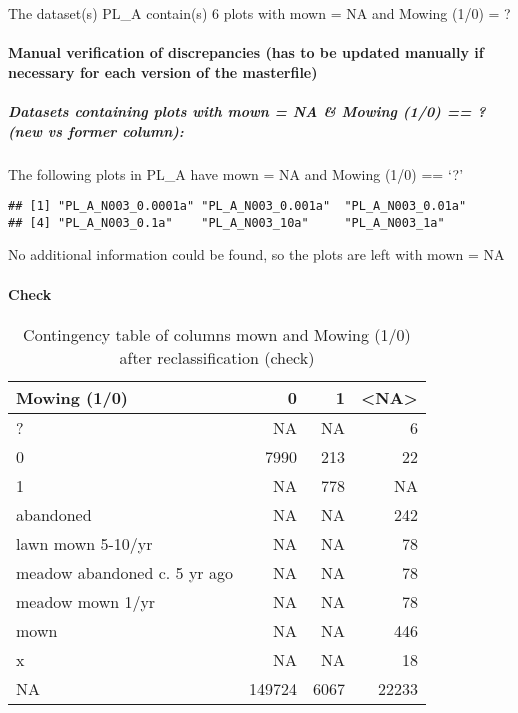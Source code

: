 \documentclass[table]{article}
\let\oldparagraph\paragraph
\renewcommand{\paragraph}[1]{\oldparagraph{#1}\mbox{}}
\let\oldsubparagraph\subparagraph
\renewcommand{\subparagraph}[1]{\oldsubparagraph{#1}\mbox{}}
\begin{document}
The dataset(s) PL\_A contain(s) 6 plots with mown = NA and Mowing (1/0)
= ?

\paragraph{Manual verification of discrepancies (has to be updated
manually if necessary for each version of the
masterfile)}\label{manual-verification-of-discrepancies-has-to-be-updated-manually-if-necessary-for-each-version-of-the-masterfile}

\subparagraph{\texorpdfstring{\emph{Datasets containing plots with mown
= NA \& Mowing (1/0) == ? (new vs former
column):}}{Datasets containing plots with mown = NA \& Mowing (1/0) == ? (new vs former column):}}\label{datasets-containing-plots-with-mown-na-mowing-10-new-vs-former-column}

The following plots in PL\_A have mown = NA and Mowing (1/0) == `?'

\begin{verbatim}
## [1] "PL_A_N003_0.0001a" "PL_A_N003_0.001a"  "PL_A_N003_0.01a"  
## [4] "PL_A_N003_0.1a"    "PL_A_N003_10a"     "PL_A_N003_1a"
\end{verbatim}

No additional information could be found, so the plots are left with
mown = NA

\paragraph{Check}\label{check}

\begin{table}[H]

\caption{\label{tab:unnamed-chunk-21}Contingency table of columns mown and Mowing (1/0) after reclassification (check)}
\centering
\begin{tabular}[t]{l|r|r|r}
\hline
Mowing (1/0) & 0 & 1 & <NA>\\
\hline
? & NA & NA & 6\\
\hline
0 & 7990 & 213 & 22\\
\hline
1 & NA & 778 & NA\\
\hline
abandoned & NA & NA & 242\\
\hline
lawn mown 5-10/yr & NA & NA & 78\\
\hline
meadow abandoned c. 5 yr ago & NA & NA & 78\\
\hline
meadow mown 1/yr & NA & NA & 78\\
\hline
mown & NA & NA & 446\\
\hline
x & NA & NA & 18\\
\hline
NA & 149724 & 6067 & 22233\\
\hline
\end{tabular}
\end{table}
\end{document}

